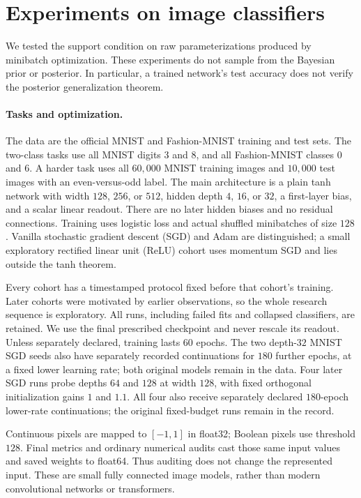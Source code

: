 \section{Experiments on image classifiers}
\label{sec:image-experiments}

We tested the support condition on raw parameterizations produced by
minibatch optimization. These experiments do not sample from the Bayesian
prior or posterior. In particular, a trained network's test accuracy does
not verify the posterior generalization theorem.

\paragraph{Tasks and optimization.}
The data are the official MNIST and Fashion-MNIST training and test sets.
The two-class tasks use all MNIST digits 3 and 8, and all Fashion-MNIST
classes 0 and 6. A harder task uses all $60{,}000$ MNIST training images
and $10{,}000$ test images with an even-versus-odd label. The main
architecture is a plain tanh network with width $128$, $256$, or $512$,
hidden depth $4$, $16$, or $32$, a first-layer bias, and a scalar linear
readout. There are no later hidden biases and no residual connections.
Training uses logistic loss and actual shuffled minibatches of size $128$.
Vanilla stochastic gradient descent (SGD) and Adam are distinguished;
a small exploratory rectified linear unit (ReLU) cohort uses momentum
SGD and lies outside the tanh theorem.

Every cohort has a timestamped protocol fixed before that cohort's
training. Later cohorts were motivated by earlier observations, so the
whole research sequence is exploratory. All runs, including failed fits
and collapsed classifiers, are retained. We use the final prescribed
checkpoint and never rescale its readout. Unless separately declared,
training lasts $60$ epochs. The two depth-$32$ MNIST SGD seeds also have
separately recorded continuations for $180$ further epochs, at a fixed
lower learning rate; both original models remain in the data.
Four later SGD runs probe depths $64$ and $128$ at width $128$, with
fixed orthogonal initialization gains $1$ and $1.1$.
All four also receive separately declared $180$-epoch lower-rate
continuations; the original fixed-budget runs remain in the record.

Continuous pixels are mapped to $[-1,1]$ in float32; Boolean pixels use
threshold $128$. Final metrics and ordinary numerical audits cast those
same input values and saved weights to float64. Thus auditing does not
change the represented input. These are small fully connected image
models, rather than modern convolutional networks or transformers.


